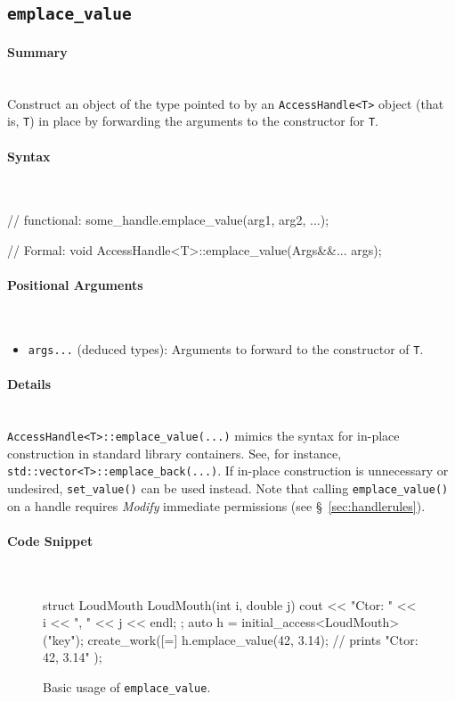 \subsection{\texttt{emplace\_value}}
\label{ssec:api_fe_emplace_value}

\paragraph{Summary}\mbox{}\\ 
Construct an object of the type pointed to by an \texttt{AccessHandle<T>} object
(that is, \texttt{T}) in place by forwarding the arguments to the constructor
for \texttt{T}.

\paragraph{Syntax}\mbox{}\\ 
\begin{CppCode}
// functional:
some_handle.emplace_value(arg1, arg2, ...);

// Formal:
void AccessHandle<T>::emplace_value(Args&&... args);
\end{CppCode}

\paragraph{Positional Arguments}\mbox{}\\ 
\begin{itemize}
  \item \texttt{args...} (deduced types):  Arguments to forward to the
  constructor of \texttt{T}.
\end{itemize}

\paragraph{Details}\mbox{}\\ 

\texttt{AccessHandle<T>::emplace\_value(...)} mimics the syntax for in-place
construction in standard library containers.  See, for instance,
\texttt{std::vector<T>::emplace\_back(...)}.  If in-place construction is
unnecessary or undesired, \texttt{set\_value()} can be used instead.  
Note that
calling \texttt{emplace\_value()} on a handle requires {\it Modify} immediate
permissions (see \S~\ref{sec:handlerules}).

\paragraph{Code Snippet}\mbox{}\\ 
\begin{figure}[!h]
\begin{CppCodeNumb}
struct LoudMouth {
  LoudMouth(int i, double j) { cout << "Ctor: " << i << ", " << j << endl; }
};
auto h = initial_access<LoudMouth>("key");
create_work([=]{
  h.emplace_value(42, 3.14); // prints "Ctor: 42, 3.14" 
});
\end{CppCodeNumb}
\label{fig:fe_api_initialaccess}
\caption{Basic usage of \texttt{emplace\_value}.}
\end{figure}

